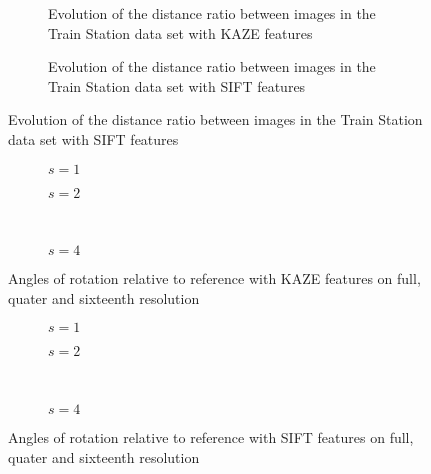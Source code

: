 \begin{figure}
   \begin{subfigure}{.5\linewidth}
      \centering      
         
         \caption{Evolution of the distance ratio between images in the Train Station
         data set with KAZE features}
      \label{fig:train_KAZE_dist_ratio}
   \end{subfigure}
   \quad
   \begin{subfigure}{.5\linewidth}
      \centering      
         
         \caption{Evolution of the distance ratio between images in the Train Station
         data set with SIFT features}
      \label{fig:train_SIFT_dist_ratio}
   \end{subfigure}
\end{figure}

\begin{figure}
   \begin{subfigure}{.5\linewidth}
      \centering      
      
      \label{fig:train_KAZE_rotation_1}
      \caption{$s=1$}
   \end{subfigure}
   \quad
   \begin{subfigure}{.5\linewidth}
      \centering      
      
      \label{fig:train_KAZE_rotation_2}
      \caption{$s=2$}
   \end{subfigure}\\[3ex]
   \begin{subfigure}{\linewidth}
      \centering      
      
      \label{fig:train_KAZE_rotation_4}
      \caption{$s=4$}
   \end{subfigure}

   \caption{Angles of rotation relative to reference with
   KAZE features on full, quater and sixteenth resolution}
\end{figure}

\begin{figure}
   \begin{subfigure}{.5\linewidth}
      \centering      
      
      \label{fig:train_SIFT_rotation_1}
      \caption{$s=1$}
   \end{subfigure}
   \quad
   \begin{subfigure}{.5\linewidth}
      \centering      
      
      \label{fig:train_SIFT_rotation_2}
      \caption{$s=2$}
   \end{subfigure}\\[3ex]
   \begin{subfigure}{\linewidth}
      \centering      
      
      \label{fig:train_SIFT_rotation_4}
      \caption{$s=4$}
   \end{subfigure}

   \caption{Angles of rotation relative to reference with
   SIFT features on full, quater and sixteenth resolution}
\end{figure}

